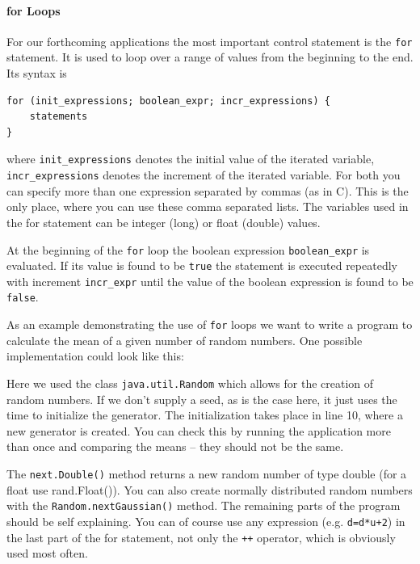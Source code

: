 \paragraph{for Loops}
For our forthcoming applications the most important control statement
is the \verb|for| statement. It is used to loop over a range of values
from the beginning to the end. Its syntax is
\begin{verbatim}
for (init_expressions; boolean_expr; incr_expressions) {
    statements
}
\end{verbatim}
where \verb|init_expressions| denotes the initial value of the iterated
variable, \verb|incr_expressions| denotes the increment of the iterated
variable. For both you can specify more than one expression separated
by commas (as in C). This is the only place, where you can use these comma
separated lists. The variables used in the for statement can be 
integer (long) or float (double) values. 

At the beginning of the \verb|for| loop the boolean expression
\verb|boolean_expr| is evaluated. If its value is found to be 
\verb|true| the statement is executed repeatedly with increment
\verb|incr_expr| until the value of the boolean expression is found to
be \verb|false|.

As an example demonstrating the use of
\verb|for| loops we want to write a program to calculate the mean of
a given number of random numbers. One possible implementation
could look like this:

Here we used the class \verb|java.util.Random| which allows for
the creation of random numbers. If we don't supply a seed, as is the
case here, it just uses the time to initialize the generator. The
initialization takes place in line 10, where a new generator is created.
You can check this by running the application more than once and comparing
the means -- they should not be the same. 

The \verb|next.Double()| method returns a new random number of type
double (for a float use rand.Float()). You can also create normally 
distributed random numbers with the \verb|Random.nextGaussian()| method.
The remaining parts of the program should be self explaining. You can of
course use any expression (e.g. \verb|d=d*u+2|) 
in the last part of the for statement, not only
the \verb|++| operator, which is obviously used most often. 

